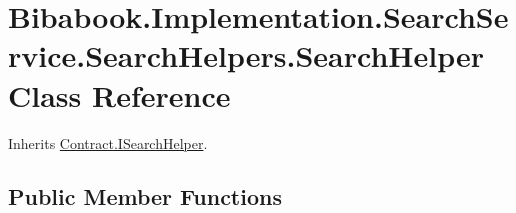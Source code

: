 \hypertarget{class_bibabook_1_1_implementation_1_1_search_service_1_1_search_helpers_1_1_search_helper}{}\section{Bibabook.\+Implementation.\+Search\+Service.\+Search\+Helpers.\+Search\+Helper Class Reference}
\label{class_bibabook_1_1_implementation_1_1_search_service_1_1_search_helpers_1_1_search_helper}


Inherits \hyperlink{interface_contract_1_1_i_search_helper}{Contract.\+I\+Search\+Helper}.

\subsection*{Public Member Functions}
